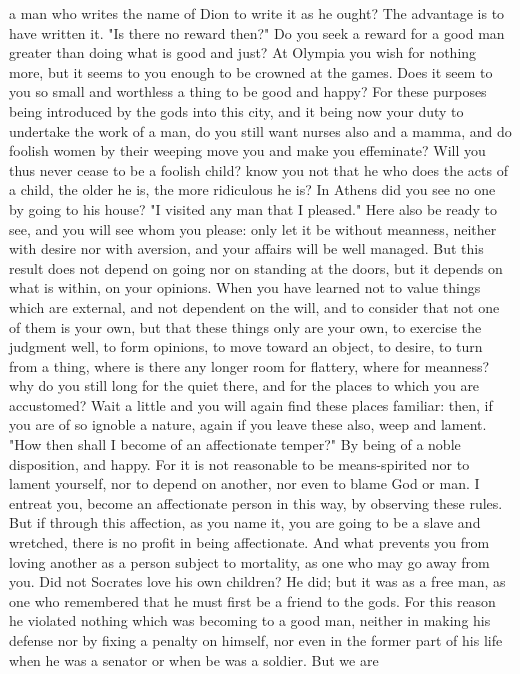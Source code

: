 \documentclass[a4paper]{article}
\begin{document}
a man who writes the name of Dion to write it as he ought? The advantage is to
have written it. "Is there no reward then?" Do you seek a reward for a good man
greater than doing what is good and just? At Olympia you wish for nothing more,
but it seems to you enough to be crowned at the games. Does it seem to you so
small and worthless a thing to be good and happy? For these purposes being
introduced by the gods into this city, and it being now your duty to undertake
the work of a man, do you still want nurses also and a mamma, and do foolish
women by their weeping move you and make you effeminate? Will you thus never
cease to be a foolish child? know you not that he who does the acts of a child,
the older he is, the more ridiculous he is?
    In Athens did you see no one by going to his house? "I visited any man that
I pleased." Here also be ready to see, and you will see whom you please: only
let it be without meanness, neither with desire nor with aversion, and your
affairs will be well managed. But this result does not depend on going nor on
standing at the doors, but it depends on what is within, on your opinions. When
you have learned not to value things which are external, and not dependent on
the will, and to consider that not one of them is your own, but that these
things only are your own, to exercise the judgment well, to form opinions, to
move toward an object, to desire, to turn from a thing, where is there any
longer room for flattery, where for meanness? why do you still long for the
quiet there, and for the places to which you are accustomed? Wait a little and
you will again find these places familiar: then, if you are of so ignoble a
nature, again if you leave these also, weep and lament.
    "How then shall I become of an affectionate temper?" By being of a noble
disposition, and happy. For it is not reasonable to be means-spirited nor to
lament yourself, nor to depend on another, nor even to blame God or man. I
entreat you, become an affectionate person in this way, by observing these
rules. But if through this affection, as you name it, you are going to be a
slave and wretched, there is no profit in being affectionate. And what prevents
you from loving another as a person subject to mortality, as one who may go
away from you. Did not Socrates love his own children? He did; but it was as a
free man, as one who remembered that he must first be a friend to the gods. For
this reason he violated nothing which was becoming to a good man, neither in
making his defense nor by fixing a penalty on himself, nor even in the former
part of his life when he was a senator or when be was a soldier. But we are
\end{document}
